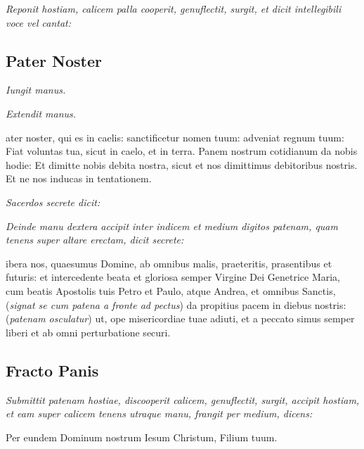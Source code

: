 \textit{%
    Reponit hostiam, calicem palla cooperit, genuflectit, surgit, et dicit
    intellegibili voce vel cantat:
}



\subsection{Pater Noster}

\textit{Iungit manus.}


\textit{Extendit manus.}

ater noster, qui es in caelis: sanctificetur nomen tuum: adveniat
regnum tuum: Fiat voluntas tua, sicut in caelo, et in terra.  Panem nostrum
cotidianum da nobis hodie: Et dimitte nobis debita nostra, sicut et nos
dimittimus debitoribus nostris.  Et ne nos inducas in tentationem.


\textit{Sacerdos secrete dicit:}


\textit{%
    Deinde manu dextera accipit inter indicem et medium digitos patenam, quam
    tenens super altare erectam, dicit secrete:
}

ibera nos, quaesumus Domine, ab omnibus malis, praeteritis,
prasentibus et futuris: et intercedente beata et gloriosa semper Virgine Dei
Genetrice Maria, cum beatis Apostolis tuis Petro et Paulo, atque Andrea, et
omnibus Sanctis, (\textit{signat se cum patena a fronte ad pectus}) da propitius
pacem in diebus nostris: (\textit{patenam osculatur}) ut, ope misericordiae tuae
adiuti, et a peccato simus semper liberi et ab omni perturbatione securi.

\subsection{Fracto Panis}

\textit{%
    Submittit patenam hostiae, discooperit calicem, genuflectit, surgit, accipit
    hostiam, et eam super calicem tenens utraque manu, frangit per medium,
    dicens:
}

{\Large\centering Per eundem Dominum nostrum Iesum Christum, Filium tuum.\par}

